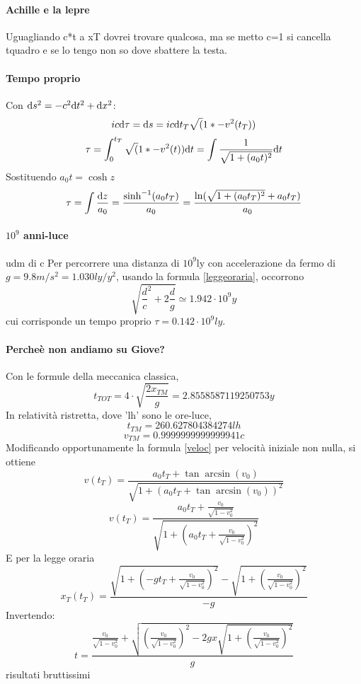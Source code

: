 \paragraph {Achille e la lepre}
Uguagliando c*t a xT dovrei trovare qualcosa, ma se metto c=1 si cancella tquadro e se lo tengo non so dove sbattere la testa.

\paragraph {Tempo proprio}
Con \(\mathrm{d} s^2 = -c^2\mathrm{d} t^2 + \mathrm{d} x^2 \):
\[ ic\mathrm{d}\tau = \mathrm{d} s = ic\mathrm{d} t_T \sqrt(1*-v^2(t_T)) \]
\[ \tau = \int_0^{t_T} \sqrt(1*-v^2(t)) \mathrm{d} t = \int \frac{1}{\sqrt{1+(a_0t)^2}} \mathrm{d} t \]
Sostituendo \( a_0t = \cosh z \)
\[ \tau = \int \frac {\mathrm{d} z}{a_0} = \frac{\sinh^{-1}(a_0t_T)}{a_0} = \frac{\ln({\sqrt{1+(a_0t_T)^2}+a_0t_T)}}{a_0}\]

\paragraph {$10^9$ anni-luce} \todo udm di c
Per percorrere una distanza di $10^9 \mathrm{ly}$ con accelerazione da fermo di \(g=9.8m/s^2=1.030ly/y^2\), usando la formula \ref{leggeoraria}, occorrono
\[ \sqrt{\frac{d}{c}^2 + 2\frac{d}{g}} \simeq 1.942\cdot10^9y \]
cui corrisponde un tempo proprio \( \tau = 0.142\cdot10^9ly \).

\paragraph {Perche\`e non andiamo su Giove?}
Con le formule della meccanica classica,
\[ t_{TOT} = 4\cdot \sqrt{\frac{2x_{TM}}{g}} = 2.8558587119250753 y \]
In relativit\`a ristretta, dove 'lh' sono le ore-luce,
\[ t_{TM} = 260.627804384274lh \]
\[ v_{TM} = 0.9999999999999941 c \]
Modificando opportunamente la formula \ref{veloc} per velocit\`a iniziale non nulla, si ottiene
\[ v(t_T) = \frac{a_0 t_T + \tan\arcsin(v_0)          }
	{\sqrt{1+( a_0t_T + \tan\arcsin(v_0)           )^2 }}  \]
\[ v(t_T) = \frac{a_0 t_T + \frac{v_0}{\sqrt{1-v_0^2}} }
	{\sqrt{1+( a_0t_T + \frac{v_0}{\sqrt{1-v_0^2}}  )^2 }}  \]
E per la legge oraria
\[ x_T(t_T) = \frac{\sqrt{1+ (-gt_T + \frac{v_0}{\sqrt{1-v_0^2}})^2 } - 
	\sqrt{1+  (\frac{v_0}{\sqrt{1-v_0^2}})^2}     }{-g} \]
Invertendo:
\[ t = \frac{ \frac{v_0}{\sqrt{1-v_0^2}} + \sqrt{ (\frac{v_0}{\sqrt{1-v_0^2}})^2 - 2gx \sqrt{1+( \frac{v_0}{\sqrt{1-v_0^2}}    )^2     }  } }
             {  g   }\]
\todo risultati bruttissimi



